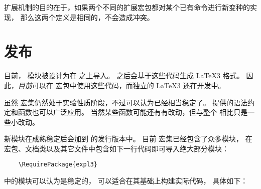 \documentclass{l3doc}
\begin{document}
%
扩展机制的目的在于，如果两个不同的扩展宏包都对某个已有命令进行新变种的实现，
那么这两个定义是相同的，不会造成冲突。

%
\section{发布}

%
目前， 模块被设计为在 \LaTeXe{} 之上导入。
之后会基于这些代码生成 \LaTeX3 格式。
因此，\emph{目前}可以在 \LaTeXe{} 宏包中使用这些代码，而独立的 \LaTeX3 还在开发中。

%
\begin{bfseries}
    虽然  宏集仍然处于实验性质阶段，不过可以认为已经相当稳定了。
    提供的语法约定和函数也可以广泛应用。
    当然某些函数可能还有有改动，但与整个  相比只是一些小改动。
\end{bfseries}

%
新模块在成熟稳定后会加到  的发行版本中。
目前  宏集已经包含了众多模块，
在 \LaTeXe{} 宏包、文档类以及其它文件中包含如下一行代码即可导入绝大部分模块：
\begin{verbatim}
    \RequirePackage{expl3}
\end{verbatim}
 中的模块可以认为是稳定的，
可以适合在其基础上构建实际代码，
具体如下：
\end{document}

